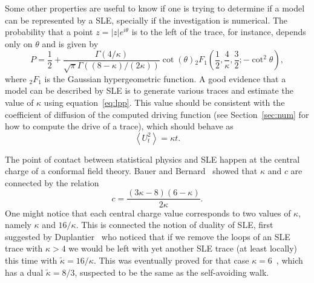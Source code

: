 Some other properties are useful to know if one is trying to determine if a
model can be represented by a SLE, specially if the investigation is numerical.
The probability that a point $z=|z|e^{i\theta}$ is to the left of the trace,
for instance, depends only on $\theta$ and is given by
\begin{equation}
    \label{eq:lpp}
    P=\frac{1}{2}+
    \frac{\Gamma\left(4/\kappa\right)}
         {\sqrt{\pi}
          \Gamma\left(\left(8-\kappa\right)/\left(2\kappa\right)\right)}
    \cot\left(\theta\right)
    {}_{2}F_{1}\left(\frac{1}{2},\frac{4}{\kappa},\frac{3}{2};
        -\cot^{2}\theta\right),
\end{equation}
where ${}_2F_1$ is the Gaussian hypergeometric function. A good evidence that a
model can be described by SLE is to generate various traces and estimate the
value of $\kappa$ using equation~\ref{eq:lpp}. This value should be consistent
with the coefficient of diffusion of the computed driving function (see
Section~\ref{sec:num} for how to compute the drive of a trace), which should
behave as
\begin{equation}
    \left\langle U_{t}^{2}\right\rangle =\kappa t.
\end{equation}

The point of contact between statistical physics and SLE happen at the
central charge of a conformal field theory. Bauer and Bernard~\cite{Bauer2002}
showed that $\kappa$ and $c$ are connected by the relation
\begin{equation}
    c=\frac{\left(3\kappa-8\right)\left(6-\kappa\right)}{2\kappa}.
\end{equation}
One might notice that each central charge value corresponds to two values of
$\kappa$, namely $\kappa$ and $16/\kappa$. This is connected the notion of
duality of SLE, first suggested by Duplantier~\cite{Duplantier2000} who noticed
that if we remove the loops of an SLE trace with $\kappa>4$ we would be left
with yet another SLE trace (at least locally) this time with
$\tilde{\kappa}=16/\kappa$. This was eventually proved for that case
$\kappa=6$~\cite{Beffara2004}, which has a dual $\tilde{\kappa}=8/3$, suspected
to be the same as the self-avoiding walk.

